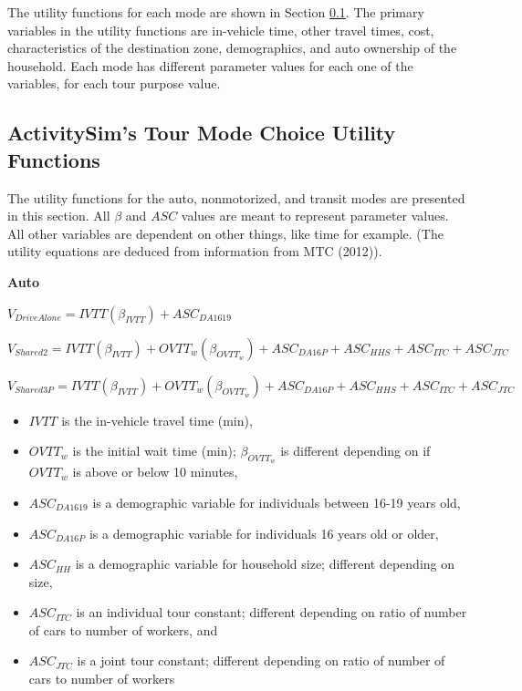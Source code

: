 \documentclass[12pt, oneside, openright]{byuthesis}
\providecommand{\tightlist}{%
  \setlength{\itemsep}{0pt}\setlength{\parskip}{0pt}}
\begin{document}
The utility functions for each mode are shown in Section \ref{lit411}. The primary variables in the utility functions are in-vehicle time, other travel times, cost, characteristics of the destination zone, demographics, and auto ownership of the household. Each mode has different parameter values for each one of the variables, for each tour purpose value.

\hypertarget{lit411}{%
\subsection{ActivitySim's Tour Mode Choice Utility Functions}\label{lit411}}

The utility functions for the auto, nonmotorized, and transit modes are presented in this section. All \(\beta\) and \(ASC\) values are meant to represent parameter values. All other variables are dependent on other things, like time for example. (The utility equations are deduced from information from MTC (2012)).

\textbf{Auto}

\(V_{DriveAlone} = IVTT(\beta_{IVTT}) + ASC_{DA1619}\)

\(V_{Shared2} = IVTT(\beta_{IVTT}) + OVTT_w(\beta_{OVTT_w}) + ASC_{DA16P} + ASC_{HHS} + ASC_{ITC} + ASC_{JTC}\)

\(V_{Shared3P} = IVTT(\beta_{IVTT}) + OVTT_w(\beta_{OVTT_w}) + ASC_{DA16P} + ASC_{HHS} + ASC_{ITC} + ASC_{JTC}\)

\begin{itemize}
\tightlist
\item
  \(IVTT\) is the in-vehicle travel time (min),
\item
  \(OVTT_w\) is the initial wait time (min); \(\beta_{OVTT_w}\) is different depending on if \(OVTT_w\) is above or below 10 minutes,
\item
  \(ASC_{DA1619}\) is a demographic variable for individuals between 16-19 years old,
\item
  \(ASC_{DA16P}\) is a demographic variable for individuals 16 years old or older,
\item
  \(ASC_{HH}\) is a demographic variable for household size; different depending on size,
\item
  \(ASC_{ITC}\) is an individual tour constant; different depending on ratio of number of cars to number of workers, and
\item
  \(ASC_{JTC}\) is a joint tour constant; different depending on ratio of number of cars to number of workers
\end{itemize}
\end{document}
